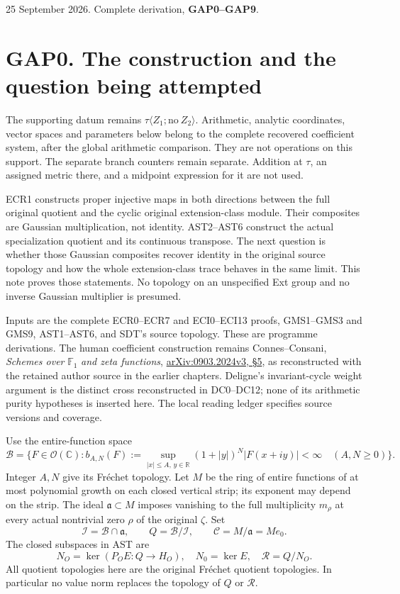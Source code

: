 25 September 2026. Complete derivation, \textbf{GAP0--GAP9}.

\section{GAP0. The construction and the question being
attempted}\label{gap0.-the-construction-and-the-question-being-attempted}

The supporting datum remains
\(\tau\langle Z_1;\mathrm{no}\ Z_2\rangle\). Arithmetic, analytic
coordinates, vector spaces and parameters below belong to the complete
recovered coefficient system, after the global arithmetic comparison.
They are not operations on this support. The separate branch counters
remain separate. Addition at \(\tau\), an assigned metric there, and a
midpoint expression for it are not used.

ECR1 constructs proper injective maps in both directions between the
full original quotient and the cyclic original extension-class module.
Their composites are Gaussian multiplication, not identity. AST2--AST6
construct the actual specialization quotient and its continuous
transpose. The next question is whether those Gaussian composites
recover identity in the original source topology and how the whole
extension-class trace behaves in the same limit. This note proves those
statements. No topology on an unspecified Ext group and no inverse
Gaussian multiplier is presumed.

Inputs are the complete ECR0--ECR7 and ECI0--ECI13 proofs, GMS1--GMS3
and GMS9, AST1--AST6, and SDT's source topology. These are programme
derivations. The human coefficient construction remains Connes--Consani,
\emph{Schemes over} \(\mathbb F_1\) \emph{and zeta functions},
\href{https://arxiv.org/abs/0903.2024v3}{arXiv:0903.2024v3, §5}, as
reconstructed with the retained author source in the earlier chapters.
Deligne's invariant-cycle weight argument is the distinct cross
reconstructed in DC0--DC12; none of its arithmetic purity hypotheses is
inserted here. The local reading ledger specifies source versions and
coverage.

Use the entire-function space \[
\mathcal B=\{F\in\mathcal O(\mathbb C):
b_{A,N}(F):=\sup_{|x|\le A,\,y\in\mathbb R}
(1+|y|)^N|F(x+iy)|<\infty\quad(A,N\ge0)\}.
\tag{GAP0.1}
\] Integer \(A,N\) give its Fréchet topology. Let \(M\) be the ring of
entire functions of at most polynomial growth on each closed vertical
strip; its exponent may depend on the strip. The ideal
\(\mathfrak a\subset M\) imposes vanishing to the full multiplicity
\(m_\rho\) at every actual nontrivial zero \(\rho\) of the original
\(\zeta\). Set \[
\mathcal I=\mathcal B\cap\mathfrak a,\qquad
Q=\mathcal B/\mathcal I,\qquad
\mathscr C=M/\mathfrak a=M e_0.
\tag{GAP0.2}
\] The closed subspaces in AST are \[
N_O=\ker(P_OE:Q\to H_O),\quad N_0=\ker E,
\quad\mathcal R=Q/N_O.
\tag{GAP0.3}
\] All quotient topologies here are the original Fréchet quotient
topologies. In particular no value norm replaces the topology of \(Q\)
or \(\mathcal R\).

